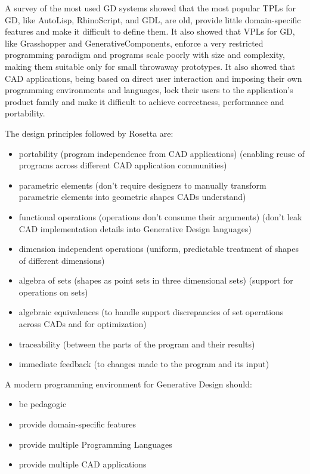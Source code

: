 \documentclass{./llncs2e/llncs}
\begin{document}
	A survey of the most used GD systems showed that the most popular TPLs for GD, like AutoLisp, RhinoScript, and GDL, are old, provide little domain-specific features and make it difficult to define them. It also showed that VPLs for GD, like Grasshopper and GenerativeComponents, enforce a very restricted programming paradigm and programs scale poorly with size and complexity, making them suitable only for small throwaway prototypes. It also showed that CAD applications, being based on direct user interaction and imposing their own programming environments and languages, lock their users to the application's product family and make it difficult to achieve correctness, performance and portability.

	The design principles followed by Rosetta are:
	\begin{itemize}
		\item portability (program independence from CAD applications) (enabling reuse of programs across different CAD application communities)
		\item parametric elements (don't require designers to manually transform parametric elements into geometric shapes CADs understand)
		\item functional operations (operations don't consume their arguments) (don't leak CAD implementation details into Generative Design languages)
		\item dimension independent operations (uniform, predictable treatment of shapes of different dimensions)
		\item algebra of sets (shapes as point sets in three dimensional sets) (support for operations on sets)
		\item algebraic equivalences (to handle support discrepancies of set operations across CADs and for optimization)
		\item traceability (between the parts of the program and their results)
		\item immediate feedback (to changes made to the program and its input)
	\end{itemize}

	A modern programming environment for Generative Design should:
	\begin{itemize}
		\item be pedagogic
		\item provide domain-specific features
		\item provide multiple Programming Languages
		\item provide multiple CAD applications
	\end{itemize}
\end{document}
